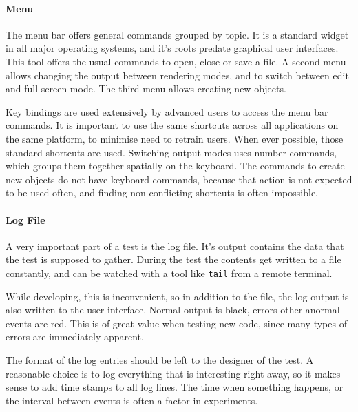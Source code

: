 \paragraph{Menu}
The menu bar offers general commands grouped by topic.
It is a standard widget in all major operating systems, and it's roots predate graphical user interfaces.
This tool offers the usual commands to open, close or save a file.
A second menu allows changing the output between rendering modes, and to switch between edit and full-screen mode.
The third menu allows creating new objects.

Key bindings are used extensively by advanced users to access the menu bar commands.
It is important to use the same shortcuts across all applications on the same platform, to minimise need to retrain users.
When ever possible, those standard shortcuts are used.
Switching output modes uses number commands, which groups them together spatially on the keyboard.
The commands to create new objects do not have keyboard commands, because that action is not expected to be used often, and finding non-conflicting shortcuts is often impossible.

\paragraph{Log File}
A very important part of a test is the log file.
It's output contains the data that the test is supposed to gather.
During the test the contents get written to a file constantly, and can be watched with a tool like \texttt{tail} from a remote terminal.

While developing, this is inconvenient, so in addition to the file, the log output is also written to the user interface.
Normal output is black, errors other anormal events are red.
This is of great value when testing new code, since many types of errors are immediately apparent.

The format of the log entries should be left to the designer of the test.
A reasonable choice is to log everything that is interesting right away, so it makes sense to add time stamps to all log lines.
The time when something happens, or the interval between events is often a factor in experiments.

